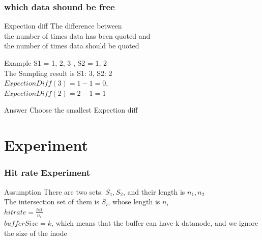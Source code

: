 \documentclass[notheorems, aspectratio=54]{beamer}
\begin{document}
\begin{frame}
    \frametitle{which data shound be free}
    \begin{block} {Expection diff}
        The difference between \\
        the number of times data has been quoted and \\
        the number of times data should be quoted
    \end{block}
    \begin{block} {Example}
        S1 = {1, 2, 3} , S2 = {1, 2} \\
        The Sampling result is {S1: 3, S2: 2} \\
        $ExpectionDiff(3) = 1-1 = 0$, \\
        $ExpectionDiff(2) = 2-1 = 1$ \\
    \end{block}
    \begin{block} {Answer}
        Choose the smallest Expection diff
    \end{block}
\end{frame}

\section{Experiment}
\begin{frame}
    \frametitle{Hit rate Experiment}
    \begin{block}{Assumption}
        There are two sets: $S_1, S_2$, and their length is $n_1, n_2$ \\
        The intersection set of them is $S_i$, whose length is $n_i$ \\
        $hitrate= \frac{hit}{n_i}$ \\
        $bufferSize = k$, which means that the buffer can have k datanode, and we ignore the size of the inode
    \end{block}
\end{frame}
\end{document}
